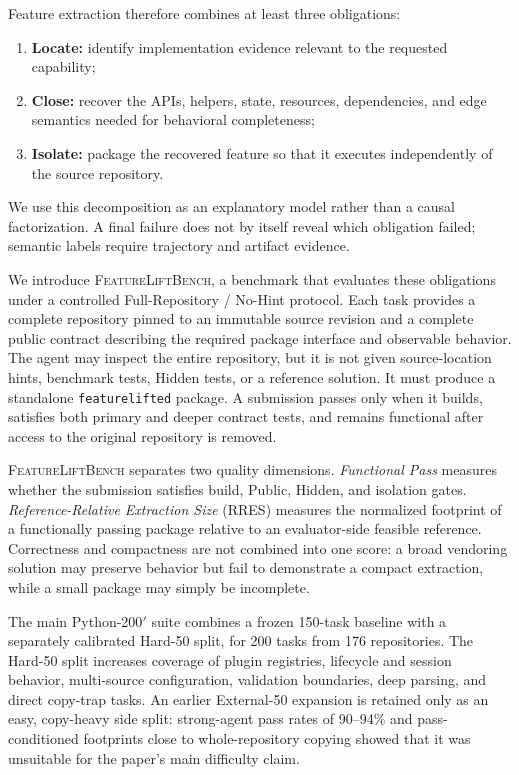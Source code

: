 \documentclass[acmsmall,anonymous,review,screen]{acmart}
\newcommand{\flb}{\textsc{FeatureLiftBench}\xspace}
\newcommand{\rres}{\textsc{RRES}\xspace}
\begin{document}
Feature extraction therefore combines at least three obligations:
\begin{enumerate}
  \item \textbf{Locate:} identify implementation evidence relevant to the
        requested capability;
  \item \textbf{Close:} recover the APIs, helpers, state, resources,
        dependencies, and edge semantics needed for behavioral completeness;
  \item \textbf{Isolate:} package the recovered feature so that it executes
        independently of the source repository.
\end{enumerate}
We use this decomposition as an explanatory model rather than a causal
factorization. A final failure does not by itself reveal which obligation
failed; semantic labels require trajectory and artifact evidence.

We introduce \flb, a benchmark that evaluates these obligations under a
controlled Full-Repository / No-Hint protocol. Each task provides a complete
repository pinned to an immutable source revision and a complete public
contract describing the required package interface and observable behavior.
The agent may inspect the entire repository, but it is not given source-location
hints, benchmark tests, Hidden tests, or a reference solution. It must produce
a standalone \texttt{featurelifted} package. A submission passes only when it
builds, satisfies both primary and deeper contract tests, and remains functional
after access to the original repository is removed.

\flb separates two quality dimensions. \emph{Functional Pass} measures whether
the submission satisfies build, Public, Hidden, and isolation gates.
\emph{Reference-Relative Extraction Size} (\rres) measures the normalized
footprint of a functionally passing package relative to an evaluator-side
feasible reference. Correctness and compactness are not combined into one
score: a broad vendoring solution may preserve behavior but fail to demonstrate
a compact extraction, while a small package may simply be incomplete.

The main Python-200$'$ suite combines a frozen 150-task baseline with a
separately calibrated Hard-50 split, for 200 tasks from 176 repositories. The
Hard-50 split increases coverage of plugin registries, lifecycle and session
behavior, multi-source configuration, validation boundaries, deep parsing, and
direct copy-trap tasks. An earlier External-50 expansion is retained only as an
easy, copy-heavy side split: strong-agent pass rates of 90--94\% and
pass-conditioned footprints close to whole-repository copying showed that it
was unsuitable for the paper's main difficulty claim.
\end{document}
